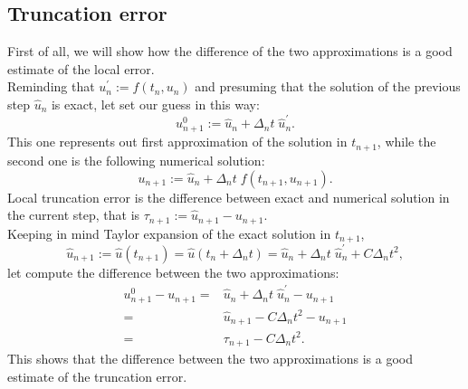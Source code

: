 \subsection{Truncation error}
First of all, we will show how the difference of the two approximations is a good estimate of the local error. \\
Reminding that $ u_n^\prime := f(t_n, u_n) $ and presuming that the solution of the previous step $ \hat{u}_n $ is exact, let set our guess in this way:
\begin{equation}
\label{guess}
u_{n+1}^0 := \hat{u}_n + \Delta_n t \; \hat{u}^\prime_n.
\end{equation} 
This one represents out first approximation of the solution in $ t_{n+1} $, while the second one is the following numerical solution:
\begin{equation*}
u_{n+1} := \hat{u}_n + \Delta_n t \; f(t_{n+1} , u_{n+1}).
\end{equation*} 
Local truncation error is the difference between exact and numerical solution in the current step, that is $ \tau_{n+1} := \hat{u}_{n+1} - u_{n+1} $.\\
Keeping in mind Taylor expansion of the exact solution in $ t_{n+1} $,
\begin{equation*}
\hat{u}_{n+1} := \hat{u}(t_{n+1}) = \hat{u}(t_{n} + \Delta_nt) = \hat{u}_n + \Delta_nt \; \hat{u}_n^\prime + C \Delta_nt^2,
\end{equation*}
let compute the difference between the two approximations:
\begin{eqnarray*}
u_{n+1}^0 - u_{n+1} = & \hat{u}_n + \Delta_n t\; \hat{u}^\prime_n -  u_{n+1} \\
 = & \hat{u}_{n+1} - C \Delta_nt^2 -  u_{n+1} \\
 = &  \tau_{n+1} - C \Delta_nt^2.
\end{eqnarray*}
This shows that the difference between the two approximations is a good estimate of the truncation error. 
